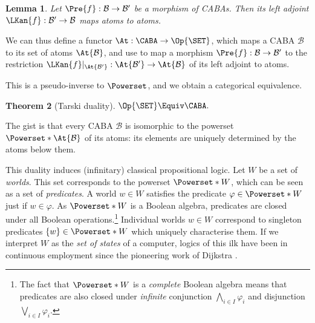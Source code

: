 \documentclass[10pt,a4paper]{article}
\newtheorem{theorem}{Theorem}
\newtheorem{lemma}[theorem]{Lemma}
\begin{document}

\begin{lemma}
  \label{lemma:left-adj-atoms}
  Let $\Pre{f} : \mathcal{B} \to \mathcal{B}'$ be a morphism of CABAs. Then its
  left adjoint $\LKan{f} : \mathcal{B}' \to \mathcal{B}$ maps atoms to atoms.
\end{lemma}

We can thus define a functor $\At : \CABA \to \Op{\SET}$, which maps a CABA
$\mathcal{B}$ to its set of atoms $\At{\mathcal{B}}$, and use
 to map a morphism
$\Pre{f} : \mathcal{B} \to \mathcal{B}'$ to the restriction
$\LKan{f}|_{\At{\mathcal{B}'}} : \At{\mathcal{B}'} \to \At{\mathcal{B}}$ of its
left adjoint to atoms.

This is a pseudo-inverse to $\Powerset$, and we obtain a categorical
equivalence.

\begin{theorem}[Tarski duality]
  $\Op{\SET} \Equiv \CABA.$
\end{theorem}

The gist is that every CABA $\mathcal{B}$ is isomorphic to the powerset
$\Powerset*{\At{\mathcal{B}}}$ of its atoms: its elements are uniquely
determined by the atoms below them.

This duality induces (infinitary) classical propositional logic. Let $W$ be a
set of \emph{worlds}. This set corresponds to the powerset $\Powerset*{W}$,
which can be seen as a set of \emph{predicates}. A world $w \in W$ satisfies the
predicate $\varphi \in \Powerset*{W}$ just if $w \in \varphi$. As
$\Powerset*{W}$ is a Boolean algebra, predicates are closed under all Boolean
operations.\footnote{The fact that $\Powerset*{W}$ is a \emph{complete} Boolean
  algebra means that predicates are also closed under \emph{infinite}
conjunction $\bigwedge_{i \in I} \varphi_i$ and disjunction $\bigvee_{i \in I}
\varphi_i$.} Individual worlds $w \in W$ correspond to singleton predicates $\{
w \} \in \Powerset*{W}$ which uniquely characterise them. If we interpret $W$ as
the \emph{set of states} of a computer, logics of this ilk have been in
continuous employment since the pioneering work of Dijkstra
\cite{dijkstra_1976}.
\end{document}
